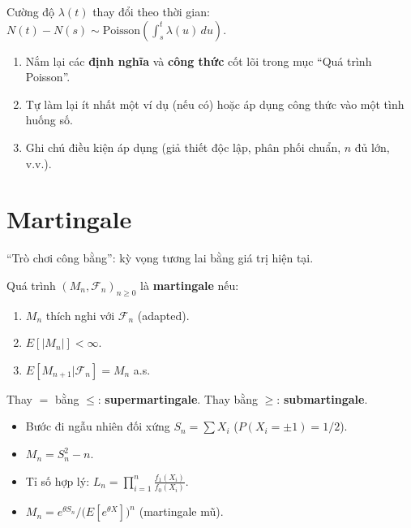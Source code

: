 \documentclass[12pt,a4paper]{article}
\begin{document}
\begin{dinhnghia}[title={Quá trình Poisson không thuần nhất}]
  Cường độ $\lambda(t)$ thay đổi theo thời gian: $N(t) - N(s) \sim \text{Poisson}\!\left(\int_s^t \lambda(u)\,du\right)$.
\end{dinhnghia}


\begin{tongket}[title={Tổng kết: Quá trình Poisson}]
\begin{enumerate}
  \item Nắm lại các \textbf{định nghĩa} và \textbf{công thức} cốt lõi trong mục ``Quá trình Poisson''.
  \item Tự làm lại ít nhất một ví dụ (nếu có) hoặc áp dụng công thức vào một tình huống số.
  \item Ghi chú điều kiện áp dụng (giả thiết độc lập, phân phối chuẩn, $n$ đủ lớn, v.v.).
\end{enumerate}
\end{tongket}

\section{Martingale}

\begin{dongco}[title={Động cơ --- Martingale}]
``Trò chơi công bằng'': kỳ vọng tương lai bằng giá trị hiện tại.
\end{dongco}

\begin{dinhnghia}
  Quá trình $(M_n, \mathcal{F}_n)_{n \ge 0}$ là \textbf{martingale} nếu:
  \begin{enumerate}
    \item $M_n$ thích nghi với $\mathcal{F}_n$ (adapted).
    \item $E[|M_n|] < \infty$.
    \item $E[M_{n+1}|\mathcal{F}_n] = M_n$ a.s.
  \end{enumerate}
  Thay $=$ bằng $\le$: \textbf{supermartingale}. Thay bằng $\ge$: \textbf{submartingale}.
\end{dinhnghia}

\begin{vidu}
  \begin{itemize}
    \item Bước đi ngẫu nhiên đối xứng $S_n = \sum X_i$ ($P(X_i = \pm 1) = 1/2$).
    \item $M_n = S_n^2 - n$.
    \item Tỉ số hợp lý: $L_n = \prod_{i=1}^n \frac{f_1(X_i)}{f_0(X_i)}$.
    \item $M_n = e^{\theta S_n}/\bigl(E[e^{\theta X}]\bigr)^n$ (martingale mũ).
  \end{itemize}
\end{vidu}
\end{document}
